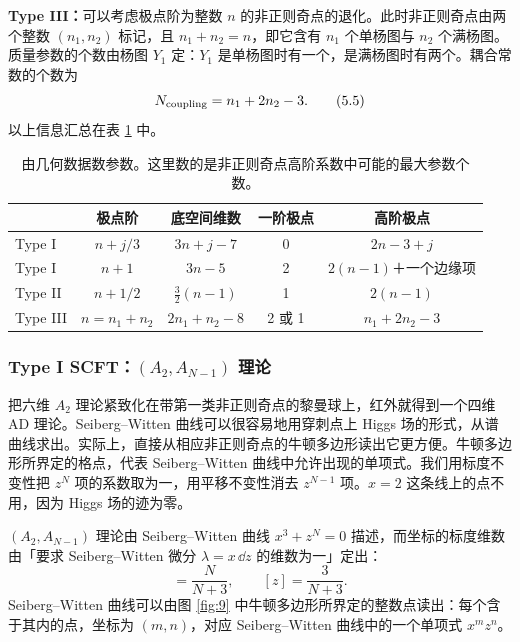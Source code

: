 \textbf{Type III：}可以考虑极点阶为整数 $n$ 的非正则奇点的退化。此时非正则奇点由两个整数 $(n_1,n_2)$ 标记，且 $n_1+n_2 = n$，即它含有 $n_1$ 个单杨图与 $n_2$ 个满杨图。质量参数的个数由杨图 $Y_1$ 定：$Y_1$ 是单杨图时有一个，是满杨图时有两个。耦合常数的个数为
\begin{equation}
N_{\text{coupling}} = n_1 + 2n_2 - 3 .
\label{eq:5.5}\tag{5.5}
\end{equation}
以上信息汇总在表 \ref{tab:4} 中。

\begin{table}[tbp]
\centering
\caption{由几何数据数参数。这里数的是非正则奇点高阶系数中可能的最大参数个数。}
\label{tab:4}
\begin{tabular}{lcccc}
\toprule
 & 极点阶 & 底空间维数 & 一阶极点 & 高阶极点\\
\midrule
Type I   & $n+j/3$        & $3n+j-7$        & 0 & $2n-3+j$\\
Type I   & $n+1$          & $3n-5$          & 2 & $2(n-1)$＋一个边缘项\\
Type II  & $n+1/2$        & $\frac{3}{2}(n-1)$ & 1 & $2(n-1)$\\
Type III & $n = n_1+n_2$  & $2n_1+n_2-8$    & 2 或 1 & $n_1+2n_2-3$\\
\bottomrule
\end{tabular}
\end{table}


\subsubsection{Type I SCFT：$(A_2,A_{N-1})$ 理论}
\label{sec:5.1.1}

把六维 $A_2$ 理论紧致化在带第一类非正则奇点的黎曼球上，红外就得到一个四维 AD 理论。Seiberg--Witten 曲线可以很容易地用穿刺点上 Higgs 场的形式，从谱曲线求出。实际上，直接从相应非正则奇点的牛顿多边形读出它更方便。牛顿多边形所界定的格点，代表 Seiberg--Witten 曲线中允许出现的单项式。我们用标度不变性把 $z^N$ 项的系数取为一，用平移不变性消去 $z^{N-1}$ 项。$x=2$ 这条线上的点不用，因为 Higgs 场的迹为零。

$(A_2,A_{N-1})$ 理论由 Seiberg--Witten 曲线 $x^3+z^N=0$ 描述，而坐标的标度维数由「要求 Seiberg--Witten 微分 $\lambda = x\,\dd z$ 的维数为一」定出：
\begin{equation}
[x] = \frac{N}{N+3},\qquad [z] = \frac{3}{N+3}.
\label{eq:5.6}\tag{5.6}
\end{equation}
Seiberg--Witten 曲线可以由图 \ref{fig:9} 中牛顿多边形所界定的整数点读出：每个含于其内的点，坐标为 $(m,n)$，对应 Seiberg--Witten 曲线中的一个单项式 $x^mz^n$。

